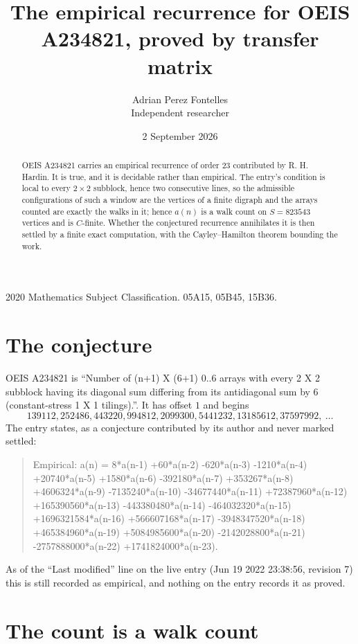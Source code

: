 \documentclass[11pt,a4paper]{article}
\title{The empirical recurrence for OEIS A234821, proved by transfer matrix}
\author{Adrian Perez Fontelles\\ \small Independent researcher}
\date{2 September 2026}
\theoremstyle{plain}
\theoremstyle{definition}
\begin{document}
\maketitle

\begin{abstract}
OEIS A234821 carries an empirical recurrence of order $23$ contributed by R. H. Hardin. It is
true, and it is decidable rather than empirical. The entry's condition is local to every $2\times2$ subblock, hence two consecutive lines, so
the admissible configurations of such a window are the vertices of a finite digraph and the
arrays counted are exactly the walks in it; hence $a(n)$ is a walk count on $S=823543$ vertices
and is $C$-finite. Whether the conjectured recurrence annihilates it is then settled by a
finite exact computation, with the Cayley--Hamilton theorem bounding the work.
\end{abstract}

\noindent\small 2020 Mathematics Subject Classification. 05A15, 05B45, 15B36.\normalsize

\section{The conjecture}

OEIS A234821 is ``Number of (n+1) X (6+1) 0..6 arrays with every 2 X 2 subblock having its diagonal sum differing from its antidiagonal sum by 6 (constant-stress 1 X 1 tilings).''. It has offset $1$ and begins
\[
139112, 252486, 443220, 994812, 2099300, 5441232, 13185612, 37597992,\ \dots
\]
The entry states, as a conjecture contributed by its author and never marked settled:
\begin{quote}
Empirical: a(n) = 8*a(n-1) +60*a(n-2) -620*a(n-3) -1210*a(n-4) +20740*a(n-5) +1580*a(n-6) -392180*a(n-7) +353267*a(n-8) +4606324*a(n-9) -7135240*a(n-10) -34677440*a(n-11) +72387960*a(n-12) +165390560*a(n-13) -443380480*a(n-14) -464032320*a(n-15) +1696321584*a(n-16) +566607168*a(n-17) -3948347520*a(n-18) +465384960*a(n-19) +5084985600*a(n-20) -2142028800*a(n-21) -2757888000*a(n-22) +1741824000*a(n-23).
\end{quote}
As of the ``Last modified'' line on the live entry (Jun 19 2022 23:38:56, revision 7) this is still
recorded as empirical, and nothing on the entry records it as proved.

\section{The count is a walk count}
\end{document}
